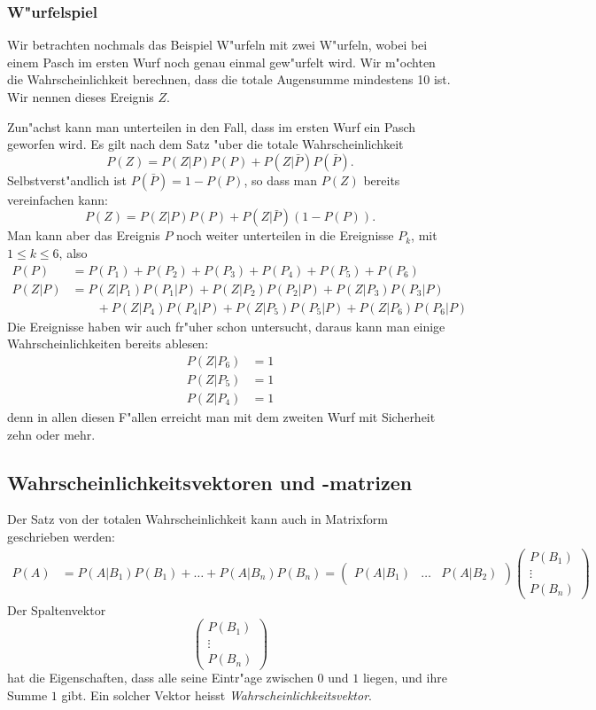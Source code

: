 \subsubsection{W"urfelspiel}
Wir betrachten nochmals das Beispiel W"urfeln mit zwei W"urfeln, wobei
bei einem Pasch im ersten Wurf noch genau einmal gew"urfelt wird. 
Wir m"ochten die Wahrscheinlichkeit berechnen, dass die totale Augensumme
mindestens 10 ist. Wir nennen dieses Ereignis $Z$.

Zun"achst kann man unterteilen in den Fall, dass im ersten Wurf
ein Pasch geworfen wird. Es gilt nach dem Satz "uber die totale
Wahrscheinlichkeit
\[
P(Z) = P(Z|P) P(P) + P(Z|\bar P) P(\bar P).
\]
Selbstverst"andlich ist $P(\bar P)=1-P(P)$, so dass man $P(Z)$ bereits
vereinfachen kann:
\[
P(Z) = P(Z|P) P(P) + P(Z|\bar P) (1-P(P)).
\]
Man kann aber das Ereignis $P$ noch weiter unterteilen in die
Ereignisse $P_k$, mit $1\le k\le 6$, also
\begin{align*}
P(P)&=
P(P_1)+
P(P_2)+
P(P_3)+
P(P_4)+
P(P_5)+
P(P_6)
\\
P(Z|P)
&=
P(Z|P_1)P(P_1|P)+
P(Z|P_2)P(P_2|P)+
P(Z|P_3)P(P_3|P)
\\
&\qquad +
P(Z|P_4)P(P_4|P)+
P(Z|P_5)P(P_5|P)+
P(Z|P_6)P(P_6|P)
\end{align*}
Die Ereignisse haben wir auch fr"uher schon untersucht, daraus kann
man einige Wahrscheinlichkeiten bereits ablesen:
\begin{align*}
P(Z|P_6)&=1\\
P(Z|P_5)&=1\\
P(Z|P_4)&=1
\end{align*}
denn in allen diesen F"allen erreicht man mit dem zweiten Wurf mit
Sicherheit zehn oder mehr.

\subsection{Wahrscheinlichkeitsvektoren und -matrizen}
Der Satz von der totalen Wahrscheinlichkeit kann auch in Matrixform
geschrieben werden:
\begin{align*}
P(A)&=P(A|B_1)P(B_1)+\dots+P(A|B_n)P(B_n)
=
\begin{pmatrix}
P(A|B_1)&\dots&P(A|B_2)
\end{pmatrix}
\begin{pmatrix}
P(B_1)\\\vdots\\P(B_n)
\end{pmatrix}
\end{align*}
Der Spaltenvektor
\[
\begin{pmatrix}
P(B_1)\\\vdots\\P(B_n)
\end{pmatrix}
\]
hat die Eigenschaften, dass alle seine Eintr"age zwischen $0$ und $1$
liegen, und ihre Summe $1$ gibt.
Ein solcher Vektor heisst {\it Wahrscheinlichkeitsvektor}.

